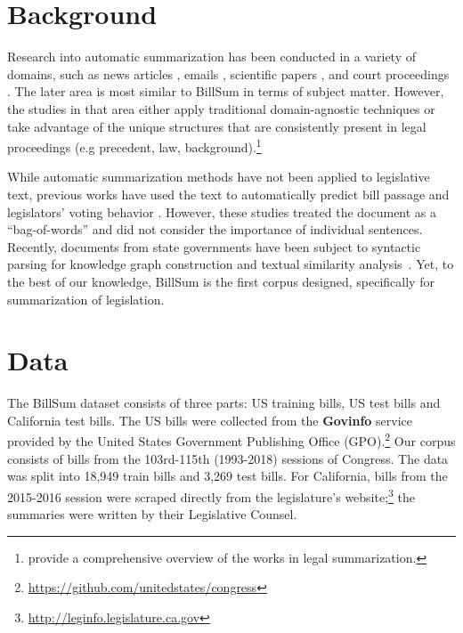 \documentclass[11pt,a4paper]{article}
\begin{document}
\section{Background}

Research into automatic summarization has been conducted in a variety of domains, such as news articles \cite{cnndailymail}, emails \cite{nenkova2004email}, scientific papers \cite{teufelscience, collins2017supervised}, and court proceedings \cite{grover-etal-2004-holj, rhetorical_roles, kim2012summarization}. The later area is most similar to BillSum in terms of subject matter. However, the studies in that area either apply traditional domain-agnostic techniques or take advantage of the unique structures that are consistently present in legal proceedings (e.g precedent, law, background).\footnote{ provide a comprehensive overview of the works in legal summarization.}



While automatic summarization methods have not been applied to legislative text, previous works have used the text to automatically predict bill passage and legislators' voting behavior \cite{gerrish2011predicting, yano2012textual, eidelman2018predictable, kornilova2018party}. However, these studies treated the document as a ``bag-of-words'' and did not consider the importance of individual sentences. Recently, documents from state governments have been subject to syntactic parsing for knowledge graph construction \cite{kalouli2018cousbi} and textual similarity analysis~\cite{text_reuse}. Yet, to the best of our knowledge, BillSum is the first corpus designed, specifically for summarization of legislation.






\section{Data}
\label{sec:data}
The BillSum dataset consists of three parts: US training bills, US test bills and California test bills. The US bills were collected from the \textbf{Govinfo} service provided by the United States Government Publishing Office (GPO).\footnote{\url{https://github.com/unitedstates/congress}} Our corpus consists of bills from the 103rd-115th (1993-2018) sessions of Congress. The data was split into 18,949 train bills and 3,269 test bills. For California, bills from the 2015-2016 session were scraped directly from the legislature's website;\footnote{\url{http://leginfo.legislature.ca.gov}} the summaries were written by their Legislative Counsel.
\end{document}
